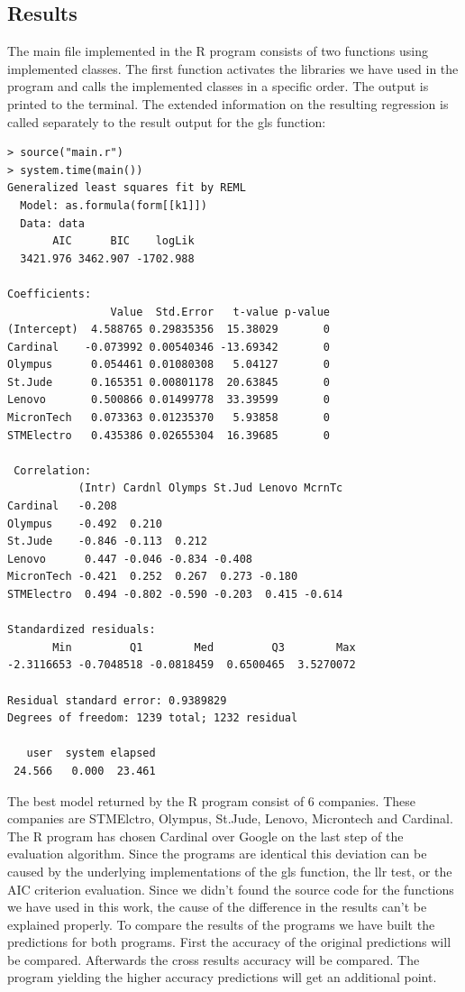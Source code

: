 \documentclass [twoside,
  11pt, a4paper,
  footinclude=true,
  headinclude=true,
  cleardoublepage=empty
]{article}
\begin{document}
\subsection{Results}
The main file implemented in the R program consists of two functions using implemented classes. The first function activates the libraries we have used in the program and calls the implemented classes in a specific order. The output is printed to the terminal. The extended information on the resulting regression is called separately to the result output for the gls function:
\begin{verbatim}
> source("main.r")
> system.time(main())
Generalized least squares fit by REML
  Model: as.formula(form[[k1]]) 
  Data: data 
       AIC      BIC    logLik
  3421.976 3462.907 -1702.988

Coefficients:
                Value  Std.Error   t-value p-value
(Intercept)  4.588765 0.29835356  15.38029       0
Cardinal    -0.073992 0.00540346 -13.69342       0
Olympus      0.054461 0.01080308   5.04127       0
St.Jude      0.165351 0.00801178  20.63845       0
Lenovo       0.500866 0.01499778  33.39599       0
MicronTech   0.073363 0.01235370   5.93858       0
STMElectro   0.435386 0.02655304  16.39685       0

 Correlation: 
           (Intr) Cardnl Olymps St.Jud Lenovo McrnTc
Cardinal   -0.208                                   
Olympus    -0.492  0.210                            
St.Jude    -0.846 -0.113  0.212                     
Lenovo      0.447 -0.046 -0.834 -0.408              
MicronTech -0.421  0.252  0.267  0.273 -0.180       
STMElectro  0.494 -0.802 -0.590 -0.203  0.415 -0.614

Standardized residuals:
       Min         Q1        Med         Q3        Max 
-2.3116653 -0.7048518 -0.0818459  0.6500465  3.5270072 

Residual standard error: 0.9389829 
Degrees of freedom: 1239 total; 1232 residual

   user  system elapsed 
 24.566   0.000  23.461 
\end{verbatim}    
The best model returned by the R program consist of 6 companies. These companies are STMElctro, Olympus, St.Jude, Lenovo, Microntech and Cardinal. The R program has chosen Cardinal over Google on the last step of the evaluation algorithm. Since the programs are identical this deviation can be caused by the underlying implementations of the gls function, the llr test, or the AIC criterion evaluation. Since we didn't found the source code for the functions we have used in this work, the cause of the difference in the results can't be explained properly. To compare the results of the programs we have built the predictions for both programs. First the accuracy of the original predictions will be compared. Afterwards the cross results accuracy will be compared. The program yielding the higher accuracy predictions will get an additional point.\\
\end{document}
